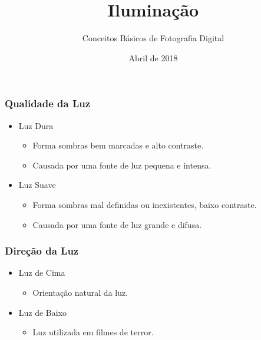 


\title{Iluminação}
\subtitle{Conceitos Básicos de Fotografia Digital}
\author{}
\date{Abril de 2018}



\coverframe

\begin{frame}
  \frametitle{Qualidade da Luz}
  \begin{itemize}
      \item Luz Dura
      \begin{itemize}
          \item Forma sombras bem marcadas e alto contraste.
          \item Causada por uma fonte de luz pequena e intensa.
      \end{itemize}

      \item Luz Suave
      \begin{itemize}
          \item Forma sombras mal definidas ou inexistentes, baixo contraste.
          \item Causada por uma fonte de luz grande e difusa.
      \end{itemize}
  \end{itemize}
\end{frame}



\begin{frame}
  \frametitle{Direção da Luz}
  \begin{itemize}
      \item Luz de Cima
      \begin{itemize}
          \item Orientação natural da luz.
      \end{itemize}
      \item Luz de Baixo
      \begin{itemize}
          \item Luz utilizada em filmes de terror.
      \end{itemize}
  \end{itemize}
\end{frame}


